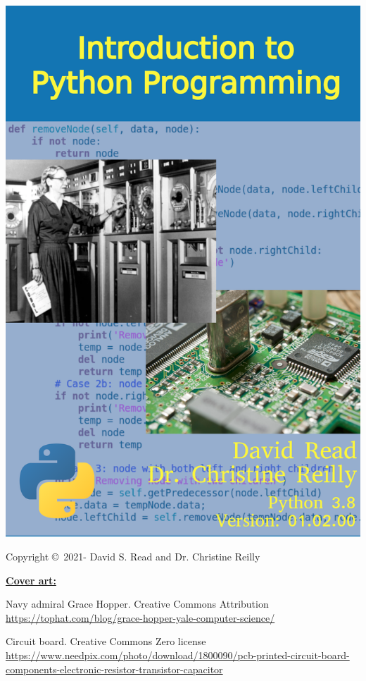 \begin{latexonly}
\begin{titlepage}
		\includegraphics[width=5.25in]{python-cover/CoverBackground.png}
\end{titlepage}

\pagebreak
\thispagestyle{empty}

{\small
Copyright \copyright ~2021- David S. Read and Dr. Christine Reilly

\underline{\textbf{Cover art:}}

Navy admiral Grace Hopper. Creative Commons Attribution
\newline
\url{https://tophat.com/blog/grace-hopper-yale-computer-science/}

Circuit board. Creative Commons Zero license
\newline \url{https://www.needpix.com/photo/download/1800090/pcb-printed-circuit-board-components-electronic-resistor-transistor-capacitor}

}
\end{latexonly}
